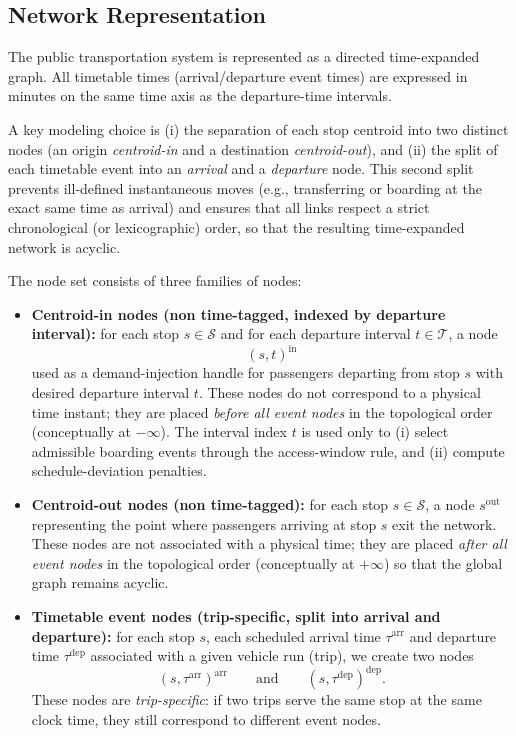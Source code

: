 \subsection{Network Representation}

The public transportation system is represented as a directed
time-expanded graph. All timetable times (arrival/departure event times) are expressed in minutes on the same time axis as the departure-time intervals.

A key modeling choice is (i) the separation of each stop centroid into two
distinct nodes (an origin \emph{centroid-in} and a destination \emph{centroid-out}),
and (ii) the split of each timetable event into an \emph{arrival} and a
\emph{departure} node. This second split prevents ill-defined instantaneous
moves (e.g., transferring or boarding at the exact same time as arrival) and
ensures that all links respect a strict chronological (or lexicographic) order,
so that the resulting time-expanded network is acyclic.

\begin{definition}[Nodes]
The node set consists of three families of nodes:
\begin{itemize}
  \item \textbf{Centroid-in nodes (non time-tagged, indexed by departure interval):}
      for each stop $s\in\mathcal{S}$ and for each departure interval $t\in\mathcal{T}$,
      a node
      \[
      (s,t)^{\mathrm{in}}
      \]
      used as a demand-injection handle for passengers departing from stop $s$
      with desired departure interval $t$. These nodes do not correspond to a physical
      time instant; they are placed \emph{before all event nodes} in the topological
      order (conceptually at $-\infty$). The interval index $t$ is used only to
      (i) select admissible boarding events through the access-window rule, and
      (ii) compute schedule-deviation penalties.
  \item \textbf{Centroid-out nodes (non time-tagged):} for each stop $s\in\mathcal{S}$,
      a node $s^{\mathrm{out}}$ representing the point where passengers arriving at stop
      $s$ exit the network. These nodes are not associated with a physical time; they
      are placed \emph{after all event nodes} in the topological order (conceptually
      at $+\infty$) so that the global graph remains acyclic.
  \item \textbf{Timetable event nodes (trip-specific, split into arrival and departure):}
      for each stop $s$, each scheduled arrival time $\tau^{\mathrm{arr}}$ and departure time
      $\tau^{\mathrm{dep}}$ associated with a given vehicle run (trip), we create two nodes
      \[
      (s,\tau^{\mathrm{arr}})^{\mathrm{arr}}
      \qquad\text{and}\qquad
      (s,\tau^{\mathrm{dep}})^{\mathrm{dep}}.
      \]
      These nodes are \emph{trip-specific}: if two trips serve the same stop at the same
      clock time, they still correspond to different event nodes.
\end{itemize}
\end{definition}

